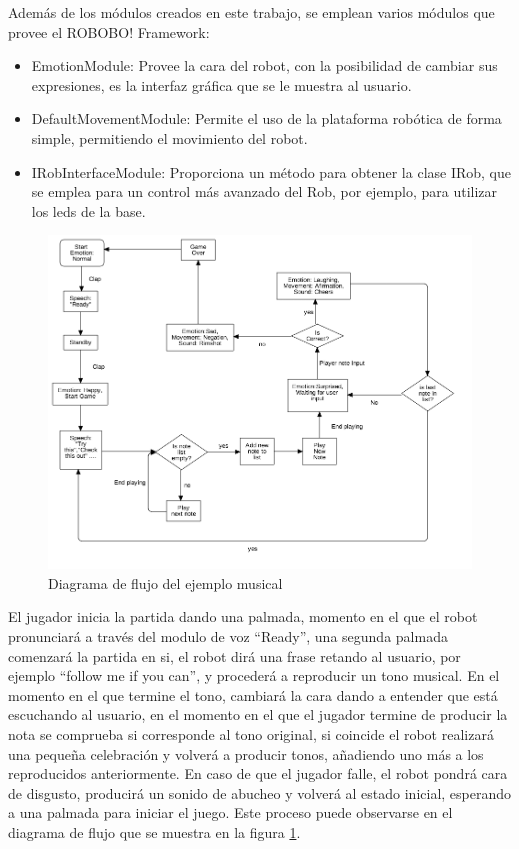 Además de los módulos creados en este trabajo, se emplean varios módulos que provee el ROBOBO! Framework:

\begin{itemize}
	\item EmotionModule: Provee la cara del robot, con la posibilidad de cambiar sus expresiones, es la interfaz gráfica que se le muestra al usuario.
	\item DefaultMovementModule: Permite el uso de la plataforma robótica de forma simple, permitiendo el movimiento del robot.
	\item IRobInterfaceModule: Proporciona un método para obtener la clase IRob, que se emplea para un control más avanzado del Rob, por ejemplo, para utilizar los leds de la base.
\end{itemize}


\begin{figure}
	\centering
	\includegraphics[width=1\linewidth]{imagenes/simon_flowchart.png}
	\caption{Diagrama de flujo del ejemplo musical}
	\label{fig:simon-flowchart}
\end{figure} 


El jugador inicia la partida dando una palmada, momento en el que el robot pronunciará a través del modulo de voz \enquote{Ready}, una segunda palmada comenzará la partida en si, el robot dirá una frase retando al usuario, por ejemplo \enquote{follow me if you can}, y procederá a reproducir un tono musical. En el momento en el que termine el tono, cambiará la cara dando a entender que está escuchando al usuario, en el momento en el que el jugador termine de producir la nota se comprueba si corresponde al tono original, si coincide el robot realizará una pequeña celebración y volverá a producir tonos, añadiendo uno más a los reproducidos anteriormente. En caso de que el jugador falle, el robot pondrá cara de disgusto, producirá un sonido de abucheo y volverá al estado inicial, esperando a una palmada para iniciar el juego. Este proceso puede observarse en el diagrama de flujo que se muestra en la figura \ref{fig:simon-flowchart}.

